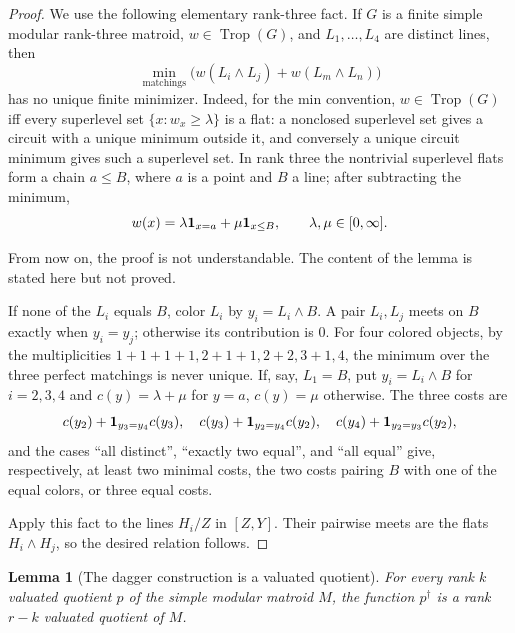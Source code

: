 \documentclass[12pt]{article}
\newtheorem{lemma}[theorem]{Lemma}
\theoremstyle{definition}
\newcommand{\Trop}{\operatorname{Trop}}
\newcommand{\review}[1]{\begin{reviewbox}#1\end{reviewbox}}
\begin{document}
\begin{proof}
We use the following elementary rank-three fact.  If \(G\) is a finite simple modular rank-three matroid, \(w\in\Trop(G)\), and \(L_1,\ldots,L_4\) are distinct lines, then
\[
\min_{\text{matchings}}
\bigl(w(L_i\wedge L_j)+w(L_m\wedge L_n)\bigr)
\]
has no unique finite minimizer.  Indeed, for the min convention, \(w\in\Trop(G)\) iff every superlevel set \(\{x:w_x\ge\lambda\}\) is a flat: a nonclosed superlevel set gives a circuit with a unique minimum outside it, and conversely a unique circuit minimum gives such a superlevel set.  In rank three the nontrivial superlevel flats form a chain \(a\le B\), where \(a\) is a point and \(B\) a line; after subtracting the minimum,
\[
w(x)=\lambda{\bf 1}_{x=a}+\mu{\bf 1}_{x\le B},\qquad \lambda,\mu\in[0,\infty].
\]
\review{From now on, the proof is not understandable. The content of the lemma is stated here but not proved.}
If none of the \(L_i\) equals \(B\), color \(L_i\) by \(y_i=L_i\wedge B\).  A pair \(L_i,L_j\) meets on \(B\) exactly when \(y_i=y_j\); otherwise its contribution is \(0\).  For four colored objects, by the multiplicities \(1+1+1+1,2+1+1,2+2,3+1,4\), the minimum over the three perfect matchings is never unique.  If, say, \(L_1=B\), put \(y_i=L_i\wedge B\) for \(i=2,3,4\) and \(c(y)=\lambda+\mu\) for \(y=a\), \(c(y)=\mu\) otherwise.  The three costs are
\[
c(y_2)+{\bf 1}_{y_3=y_4}c(y_3),\quad
c(y_3)+{\bf 1}_{y_2=y_4}c(y_2),\quad
c(y_4)+{\bf 1}_{y_2=y_3}c(y_2),
\]
and the cases ``all distinct'', ``exactly two equal'', and ``all equal'' give, respectively, at least two minimal costs, the two costs pairing \(B\) with one of the equal colors, or three equal costs.

Apply this fact to the lines \(H_i/Z\) in \([Z,Y]\).  Their pairwise meets are the flats \(H_i\wedge H_j\), so the desired relation follows.
\end{proof}

\begin{lemma}[The dagger construction is a valuated quotient]\label{lem:daggerquotient}
For every rank \(k\) valuated quotient \(p\) of the simple modular matroid \(M\), the function \(p^\dagger\) is a rank \(r-k\) valuated quotient of \(M\).
\end{lemma}
\end{document}
